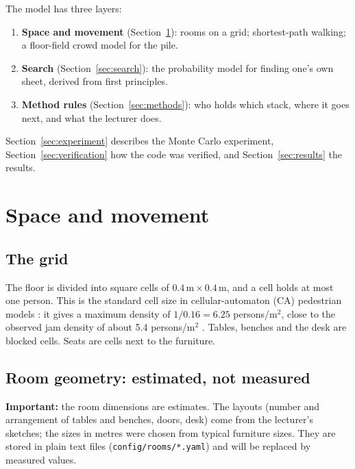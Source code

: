 \documentclass[11pt,a4paper]{article}
\begin{document}
The model has three layers:
\begin{enumerate}
  \item \textbf{Space and movement} (Section~\ref{sec:space}): rooms on a grid; shortest-path walking; a floor-field crowd model for the pile.
  \item \textbf{Search} (Section~\ref{sec:search}): the probability model for finding one's own sheet, derived from first principles.
  \item \textbf{Method rules} (Section~\ref{sec:methods}): who holds which stack, where it goes next, and what the lecturer does.
\end{enumerate}
Section~\ref{sec:experiment} describes the Monte Carlo experiment, Section~\ref{sec:verification} how the code was verified, and Section~\ref{sec:results} the results.

\section{Space and movement}\label{sec:space}

\subsection{The grid}
The floor is divided into square cells of $0.4\,\text{m}\times 0.4\,\text{m}$, and a cell holds at most one person.
This is the standard cell size in cellular-automaton (CA) pedestrian models \cite{burstedde2001,kirchner2002}: it gives a maximum density of $1/0.16 = 6.25$ persons/m$^2$, close to the observed jam density of about 5.4 persons/m$^2$ \cite{weidmann1993}.
Tables, benches and the desk are blocked cells. Seats are cells next to the furniture.

\subsection{Room geometry: estimated, not measured}
\textbf{Important:} the room dimensions are estimates. The layouts (number and arrangement of tables and benches, doors, desk) come from the lecturer's sketches; the sizes in metres were chosen from typical furniture sizes.
They are stored in plain text files (\texttt{config/rooms/*.yaml}) and will be replaced by measured values.
\end{document}
